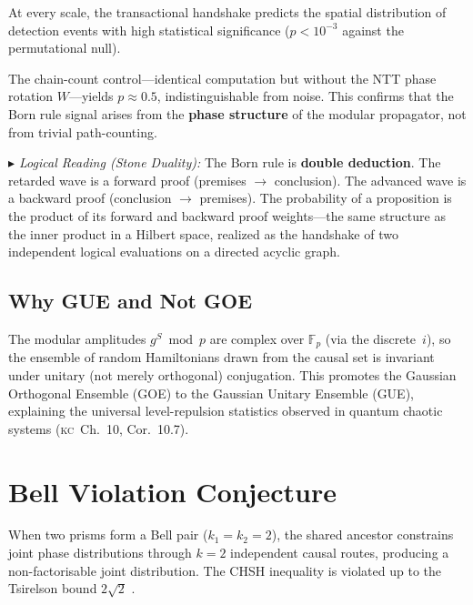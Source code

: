 \documentclass[11pt, a4paper, openany]{book}
\newcommand{\KC}[1]{\textnormal{(\textsc{kc}~#1)}}
\newcommand{\stoneref}[1]{%
  \smallskip\noindent
  {\small\color{structure!70}\textit{$\blacktriangleright$ Logical Reading
  (Stone Duality):} #1}%
  \smallskip}
\begin{document}
\medskip\noindent
At every scale, the transactional handshake predicts the
spatial distribution of detection events with high statistical
significance ($p < 10^{-3}$ against the permutational null).

The chain-count control---identical computation but without
the NTT phase rotation $W$---yields $p \approx 0.5$,
indistinguishable from noise. This confirms that the Born
rule signal arises from the \textbf{phase structure} of the
modular propagator, not from trivial path-counting.

\stoneref{The Born rule is \textbf{double deduction}. The retarded
wave is a forward proof (premises $\to$ conclusion). The advanced
wave is a backward proof (conclusion $\to$ premises). The probability
of a proposition is the product of its forward and backward
proof weights---the same structure as the inner product in a
Hilbert space, realized as the handshake of two independent
logical evaluations on a directed acyclic graph.}

\subsection{Why GUE and Not GOE}

The modular amplitudes $g^S \bmod p$ are complex over
$\mathbb{F}_p$ (via the discrete~$i$), so the ensemble of random
Hamiltonians drawn from the causal set is invariant under unitary
(not merely orthogonal) conjugation. This promotes the Gaussian
Orthogonal Ensemble (GOE) to the Gaussian Unitary Ensemble (GUE),
explaining the universal level-repulsion statistics observed in
quantum chaotic systems \KC{Ch.~10, Cor.~10.7}.

\section{Bell Violation Conjecture}\label{sec:bell}

\begin{conjecture}\label{conj:bell}
When two prisms form a Bell pair ($k_1 = k_2 = 2$), the shared
ancestor constrains joint phase distributions through $k = 2$
independent causal routes, producing a non-factorisable joint
distribution. The CHSH inequality is violated up to the Tsirelson
bound $2\sqrt{2}$ \cite{bell1964, tsirelson1980}.
\end{conjecture}
\end{document}
